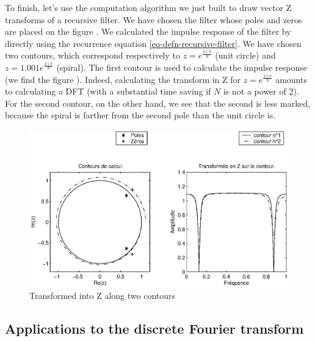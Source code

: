  
 To finish, let's use the computation algorithm we just built to draw vector Z transforms of a recursive filter. We have chosen the filter whose poles and zeros are placed on the figure . We calculated the impulse response of the filter by directly using the recurrence equation \eqref{eq-defn-recursive-filter}. We have chosen two contours, which correspond respectively to $ z = e^{\frac{2 \imath \pi}{N}} $ (unit circle) and $ z = 1.001 e^{\frac{2 \imath \pi }{N}} $ (spiral). The first contour is used to calculate the impulse response (we find the figure ). Indeed, calculating the transform in Z for $ z = e^{\frac{2 \imath \pi}{N}} $ amounts to calculating a DFT (with a substantial time saving if $ N $ is not a power of 2). For the second contour, on the other hand, we see that the second  is less marked, because the spiral is farther from the second pole than the unit circle is. \begin{figure}[ht]
    \begin{center}
    \includegraphics [scale = 0.6]{images/z-transform.eps}
    \end{center}
    \caption{Transformed into Z along two contours}
              \label{fig-z-transform}
\end{figure}
 
\subsection{Applications to the discrete Fourier transform}
\label{sect2-applications-z-transform-tfd} 
 
